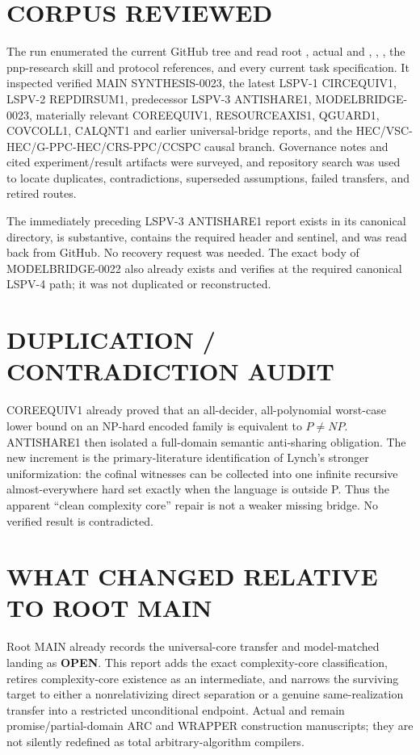 \documentclass[11pt]{article}
\newcommand{\OPEN}{\textbf{OPEN}}
\begin{document}
\section{CORPUS REVIEWED}
The run enumerated the current GitHub tree and read root ,
actual  and , ,
, the pnp-research skill and protocol references, and every
current task specification.  It inspected verified MAIN SYNTHESIS-0023, the
latest LSPV-1 CIRCEQUIV1, LSPV-2 REPDIRSUM1, predecessor LSPV-3 ANTISHARE1,
MODELBRIDGE-0023, materially relevant COREEQUIV1, RESOURCEAXIS1, QGUARD1,
COVCOLL1, CALQNT1 and earlier universal-bridge reports, and the
HEC/VSC-HEC/G-PPC-HEC/CRS-PPC/CCSPC causal branch.  Governance notes and
cited experiment/result artifacts were surveyed, and repository search was
used to locate duplicates, contradictions, superseded assumptions, failed
transfers, and retired routes.

The immediately preceding LSPV-3 ANTISHARE1 report exists in its canonical
directory, is substantive, contains the required header and sentinel, and
was read back from GitHub.  No recovery request was needed.  The exact body
of MODELBRIDGE-0022 also already exists and verifies at the required canonical
LSPV-4 path; it was not duplicated or reconstructed.

\section{DUPLICATION / CONTRADICTION AUDIT}
COREEQUIV1 already proved that an all-decider, all-polynomial worst-case lower
bound on an NP-hard encoded family is equivalent to \(P\ne NP\).  ANTISHARE1
then isolated a full-domain semantic anti-sharing obligation.  The new
increment is the primary-literature identification of Lynch's stronger
uniformization: the cofinal witnesses can be collected into one infinite
recursive almost-everywhere hard set exactly when the language is outside P.
Thus the apparent ``clean complexity core'' repair is not a weaker missing
bridge.  No verified result is contradicted.

\section{WHAT CHANGED RELATIVE TO ROOT MAIN}
Root MAIN already records the universal-core transfer and model-matched
landing as \OPEN.  This report adds the exact complexity-core classification,
retires complexity-core existence as an intermediate, and narrows the
surviving target to either a nonrelativizing direct separation or a genuine
same-realization transfer into a restricted unconditional endpoint.  Actual
 and  remain promise/partial-domain ARC and
WRAPPER construction manuscripts; they are not silently redefined as total
arbitrary-algorithm compilers.
\end{document}
